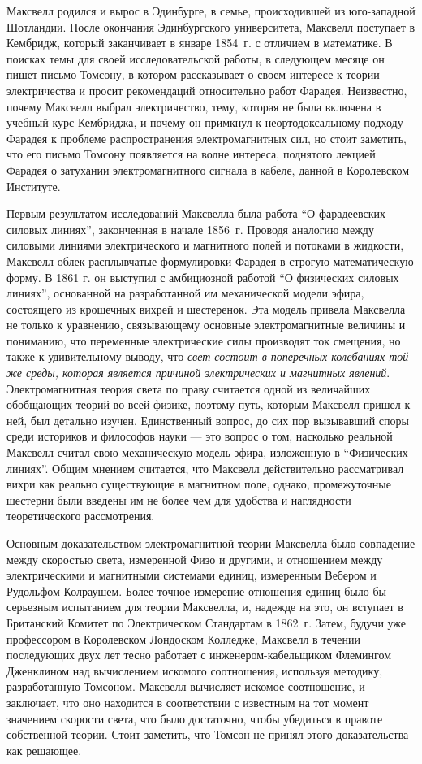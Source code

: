 \documentclass[12pt, oneside, a4paper]{article}
\begin{document}
Максвелл родился и вырос в Эдинбурге, в семье, происходившей из юго-западной Шотландии. После окончания Эдинбургского университета, Максвелл поступает в Кембридж, который заканчивает в январе 1854~г. с отличием в математике. В поисках темы для своей исследовательской работы, в следующем месяце он пишет письмо Томсону, в котором рассказывает о своем интересе к теории электричества и просит рекомендаций относительно работ Фарадея. Неизвестно, почему Максвелл выбрал электричество, тему, которая не была включена в учебный курс Кембриджа, и почему он примкнул к неортодоксальному подходу Фарадея к проблеме распространения электромагнитных сил, но стоит заметить, что  его письмо Томсону появляется на волне интереса, поднятого лекцией Фарадея о затухании электромагнитного сигнала в кабеле, данной в Королевском Институте. 

Первым результатом исследований Максвелла была работа ``О фарадеевских силовых линиях'', законченная в начале 1856~г. Проводя аналогию между силовыми линиями электрического и магнитного полей и потоками в жидкости, Максвелл облек расплывчатые формулировки Фарадея в строгую математическую форму. В 1861 г. он выступил с амбициозной работой ``О физических силовых линиях'', основанной на разработанной им механической модели эфира, состоящего из крошечных вихрей и шестеренок. Эта модель привела Максвелла не только к уравнению, связывающему основные электромагнитные величины и пониманию, что переменные электрические силы производят ток смещения, но также к удивительному выводу, что \emph{свет состоит в поперечных колебаниях той же среды, которая является причиной электрических и магнитных явлений}. 
Электромагнитная теория света по праву считается одной из величайших обобщающих теорий во всей физике, поэтому путь, которым Максвелл пришел к ней, был детально изучен. Единственный вопрос, до сих пор вызывавший споры среди историков и философов науки --- это вопрос о том, насколько реальной Максвелл считал свою механическую модель эфира, изложенную в ``Физических линиях''. Общим мнением считается, что Максвелл действительно рассматривал вихри как реально существующие в магнитном поле, однако, промежуточные шестерни были введены им не более чем для удобства и наглядности теоретического рассмотрения. 

Основным доказательством электромагнитной теории Максвелла было совпадение между скоростью света, измеренной Физо и другими, и отношением между электрическими и магнитными системами единиц, измеренным Вебером  и Рудольфом Колраушем. Более точное измерение отношения единиц было бы серьезным испытанием для теории Максвелла, и, надежде на это, он вступает в Британский Комитет по Электрическом Стандартам в 1862~г. Затем, будучи уже профессором в Королевском Лондоском Колледже, Максвелл в течении последующих двух лет тесно работает с инженером-кабельщиком Флемингом Дженклином над вычислением искомого соотношения, используя методику, разработанную Томсоном. Максвелл вычисляет искомое соотношение, и заключает, что оно находится в соответствии с известным на тот момент значением скорости света, что было достаточно, чтобы убедиться в правоте собственной теории. Стоит заметить, что Томсон не принял этого доказательства как решающее. 
\end{document}
